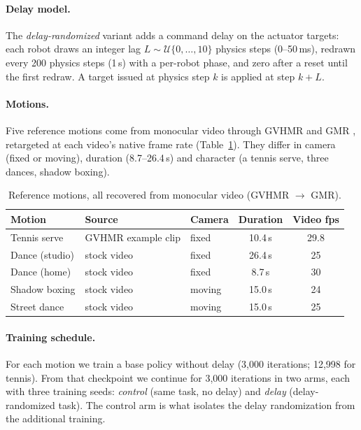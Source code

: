 \documentclass{l4dc2026}
\begin{document}
\paragraph{Delay model.}
The \emph{delay-randomized} variant adds a command delay on the actuator targets: each robot draws an integer lag $L\sim\mathcal{U}\{0,\dots,10\}$ physics steps (0--50\,ms), redrawn every 200 physics steps (1\,s) with a per-robot phase, and zero after a reset until the first redraw.
A target issued at physics step $k$ is applied at step $k+L$.

\paragraph{Motions.}
Five reference motions come from monocular video through GVHMR \citep{shen2024gvhmr} and GMR \citep{araujo2025retargeting}, retargeted at each video's native frame rate (Table~\ref{tab:motions}).
They differ in camera (fixed or moving), duration (8.7--26.4\,s) and character (a tennis serve, three dances, shadow boxing).

\begin{table}[t]
\centering\small
\begin{tabular}{lllcc}
\toprule
Motion & Source & Camera & Duration & Video fps \\
\midrule
Tennis serve & GVHMR example clip & fixed & 10.4\,s & 29.8 \\
Dance (studio) & stock video & fixed & 26.4\,s & 25 \\
Dance (home) & stock video & fixed & 8.7\,s & 30 \\
Shadow boxing & stock video & moving & 15.0\,s & 24 \\
Street dance & stock video & moving & 15.0\,s & 25 \\
\bottomrule
\end{tabular}
\caption{Reference motions, all recovered from monocular video (GVHMR $\rightarrow$ GMR).}
\label{tab:motions}
\end{table}

\paragraph{Training schedule.}
For each motion we train a base policy without delay (3,000 iterations; 12,998 for tennis).
From that checkpoint we continue for 3,000 iterations in two arms, each with three training seeds: \emph{control} (same task, no delay) and \emph{delay} (delay-randomized task).
The control arm is what isolates the delay randomization from the additional training.
\end{document}
